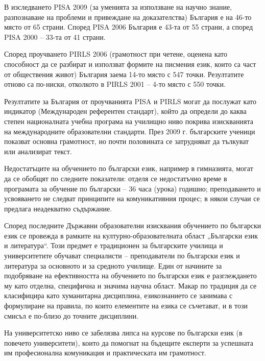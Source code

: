 \documentclass[]{../../metanetpaper}
\begin{document}
\begin{multicols}{2}
В изследването PISA 2009 \cite{oecd} (за уменията за използване на
 научно знание, разпознаване на проблеми и привеждане
 на доказателства) България е на 46-то място от 65 страни.
 Според PISA 2006 България е 43-та от 55 страни, а според
 PISA 2000 – 33-та от 41 страни.
 
Според проучването PIRLS 2006 \cite{nces} (грамотност при четене, оценена като способност да се разбират и използват формите на писмения език, които са част от обществения живот) България заема 14-то място с 547 точки. Резултатите отново са по-ниски, отколкото в PIRLS 2001 – 4-то място с 550 точки.

Резултатите за България от проучванията PISA и PIRLS могат да послужат като индикатор (Международен референтен стандарт), който да определи до каква степен
 националната учебна програма на училищно ниво
 покрива
 изискванията
 на
 международните образователни стандарти. През 2009 г. българските ученици показват основна грамотност, но почти половината се затрудняват да тълкуват или анализират
 текст.

Недостатъците на обучението по български език, например в гимназията, могат да се обобщят по следните
 показатели: отделя се недостатъчно време в програмата
 за обучение по български – 36 часа (урока) годишно;
 преподаването и усвояването не следват принципите на
 комуникативния процес; в някои случаи се предлага неадекватно
 съдържание.

Според последните Държавни образователни изисквания обучението по български език се провежда в рамките на културно-образователната област „Български
 език и литература“. Този предмет е традиционен за
 българските училища и университетите обучават
 специалисти – преподаватели по български език и литература за
 основното и за средното училище. Един от начините за
 подобряване на ефективността на обучението по български
 език е разглеждането му като отделна, специфична и значима научна област. Макар по традиция да се
 класифицира
 като
 хуманитарна
 дисциплина,
 езикознанието се занимава с формулиране на правила,
 по които елементите на езика се съчетават, и в този
 смисъл е по-близо до точните дисциплини.

На университетско ниво се забелязва липса на курсове по
 български език (в повечето университети), които да помогнат на
 бъдещите експерти за успешната им професионална
 комуникация и практическата им грамотност.



\end{multicols}
\end{document}
